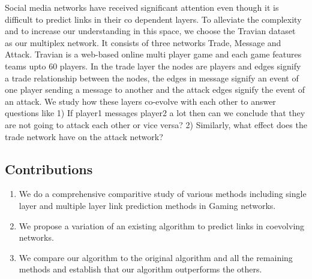 Social media networks have received significant attention even though it is
difficult to predict links in their co dependent layers. To alleviate the
complexity  and to increase our understanding in this space, we choose the
Travian dataset~\cite{travianDataset} as our multiplex network. It consists of
three networks Trade, Message and Attack. Travian is a web-based online multi
player game and  each game features teams upto $60$ players. In the trade
layer the nodes are players and edges signify a trade relationship between the
nodes, the edges in message signify an event of one player sending a message
to another and  the attack edges signify the event of an attack. We study how
these layers co-evolve with each other to answer questions like 1) If player1
messages player2 a lot then can we conclude that they are not going to attack
each other or vice versa? 2) Similarly, what effect does the trade network
have on the attack network?









\subsection{Contributions}
\label{sec:contribution}

\begin{enumerate}
	\item 	We do a comprehensive comparitive study of various methods including 
	single layer  and multiple layer link prediction methods in Gaming networks.
	\item We propose a variation of an existing algorithm to predict links in coevolving networks.
	\item We compare our algorithm to the original algorithm and all the remaining methods and establish 
	that our algorithm outperforms the others.
\end{enumerate}	






